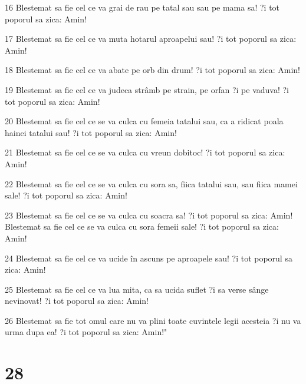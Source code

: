 \par 16 Blestemat sa fie cel ce va grai de rau pe tatal sau sau pe mama sa! ?i tot poporul sa zica: Amin!
\par 17 Blestemat sa fie cel ce va muta hotarul aproapelui sau! ?i tot poporul sa zica: Amin!
\par 18 Blestemat sa fie cel ce va abate pe orb din drum! ?i tot poporul sa zica: Amin!
\par 19 Blestemat sa fie cel ce va judeca strâmb pe strain, pe orfan ?i pe vaduva! ?i tot poporul sa zica: Amin!
\par 20 Blestemat sa fie cel ce se va culca cu femeia tatalui sau, ca a ridicat poala hainei tatalui sau! ?i tot poporul sa zica: Amin!
\par 21 Blestemat sa fie cel ce se va culca cu vreun dobitoc! ?i tot poporul sa zica: Amin!
\par 22 Blestemat sa fie cel ce se va culca cu sora sa, fiica tatalui sau, sau fiica mamei sale! ?i tot poporul sa zica: Amin!
\par 23 Blestemat sa fie cel ce se va culca cu soacra sa! ?i tot poporul sa zica: Amin! Blestemat sa fie cel ce se va culca cu sora femeii sale! ?i tot poporul sa zica: Amin!
\par 24 Blestemat sa fie cel ce va ucide în ascuns pe aproapele sau! ?i tot poporul sa zica: Amin!
\par 25 Blestemat sa fie cel ce va lua mita, ca sa ucida suflet ?i sa verse sânge nevinovat! ?i tot poporul sa zica: Amin!
\par 26 Blestemat sa fie tot omul care nu va plini toate cuvintele legii acesteia ?i nu va urma dupa ea! ?i tot poporul sa zica: Amin!"

\chapter{28}

